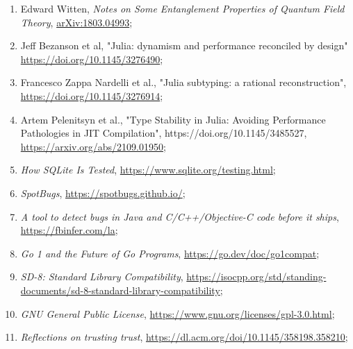 \documentclass[a4paper,11pt]{article}
\begin{document}
\begin{enumerate}

\item Edward Witten, \textit{Notes on Some Entanglement Properties of
    Quantum Field Theory},
  \href{https://arxiv.org/abs/1803.04993}{arXiv:1803.04993};

\item Jeff Bezanson et al, "Julia: dynamism and performance reconciled
  by design"
  \href{https://doi.org/10.1145/3276490}{https://doi.org/10.1145/3276490};

\item Francesco Zappa Nardelli et al., "Julia subtyping: a rational
  reconstruction",
  \href{https://doi.org/10.1145/3276914}{https://doi.org/10.1145/3276914};

\item Artem Pelenitsyn et al., "Type Stability in Julia: Avoiding
  Performance Pathologies in JIT Compilation",
  https://doi.org/10.1145/3485527,
  \href{arXiv:2109.01950}{https://arxiv.org/abs/2109.01950};

\item \textit{How SQLite Is Tested},
  \href{https://www.sqlite.org/testing.html}{https://www.sqlite.org/testing.html};

\item \textit{SpotBugs},
  \href{https://spotbugs.github.io/}{https://spotbugs.github.io/};

\item \textit{A tool to detect bugs in Java and C/C++/Objective-C code
    before it ships},
  \href{https://fbinfer.com/}{https://fbinfer.com/la};

\item \textit{Go 1 and the Future of Go Programs},
  \href{https://go.dev/doc/go1compat}{https://go.dev/doc/go1compat};

\item \textit{SD-8: Standard Library Compatibility},
  \href{https://isocpp.org/std/standing-documents/sd-8-standard-library-compatibility}{https://isocpp.org/std/standing-documents/sd-8-standard-library-compatibility};

\item \textit{GNU General Public License},
  \href{https://www.gnu.org/licenses/gpl-3.0.html}{https://www.gnu.org/licenses/gpl-3.0.html};

\item \textit{Reflections on trusting trust},
  \href{https://dl.acm.org/doi/10.1145/358198.358210}{https://dl.acm.org/doi/10.1145/358198.358210};


\end{enumerate}
\end{document}
